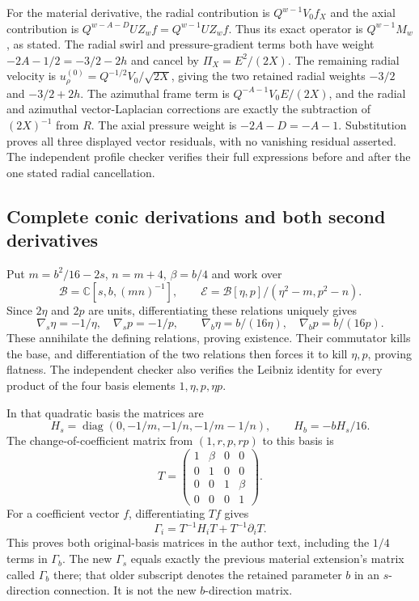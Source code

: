For the material derivative, the radial contribution is
$Q^{w-1}V_0f_X$ and the axial contribution is
$Q^{w-A-D}UZ_wf=Q^{w-1}UZ_wf$.
Thus its exact operator is $Q^{w-1}M_w$, as stated.
The radial swirl and pressure-gradient terms both have weight
$-2A-1/2=-3/2-2h$ and cancel by
$\Pi_X=E^2/(2X)$. The remaining radial velocity is
$u_\rho^{(0)}=Q^{-1/2}V_0/\sqrt{2X}$, giving the two retained
radial weights $-3/2$ and $-3/2+2h$. The azimuthal frame term
is $Q^{-A-1}V_0E/(2X)$, and the radial and azimuthal
vector-Laplacian corrections are exactly the subtraction of
$(2X)^{-1}$ from $R$. The axial pressure weight is
$-2A-D=-A-1$. Substitution proves all three displayed vector
residuals, with no vanishing residual asserted. The independent
profile checker verifies their full expressions before and after
the one stated radial cancellation.

\subsection*{Complete conic derivations and both second derivatives}

Put $m=b^2/16-2s$, $n=m+4$, $\beta=b/4$ and work over
\[
 \mathcal B=\mathbb C[s,b,(mn)^{-1}],\qquad
 \mathcal E=\mathcal B[\eta,p]/(\eta^2-m,p^2-n).
\]
Since $2\eta$ and $2p$ are units, differentiating these relations
uniquely gives
\[
 \nabla_s\eta=-1/\eta,\quad\nabla_sp=-1/p,\qquad
 \nabla_b\eta=b/(16\eta),\quad\nabla_bp=b/(16p).
\]
These annihilate the defining relations, proving existence. Their
commutator kills the base, and differentiation of the two relations
then forces it to kill $\eta,p$, proving flatness. The independent
checker also verifies the Leibniz identity for every product of the
four basis elements $1,\eta,p,\eta p$.

In that quadratic basis the matrices are
\[
 H_s=\operatorname{diag}(0,-1/m,-1/n,-1/m-1/n),\qquad
 H_b=-bH_s/16.
\]
The change-of-coefficient matrix from $(1,r,p,rp)$ to this basis is
\[
 T=\begin{pmatrix}1&\beta&0&0\\0&1&0&0\\
       0&0&1&\beta\\0&0&0&1\end{pmatrix}.
\]
For a coefficient vector $f$, differentiating $Tf$ gives
\[
 \Gamma_i=T^{-1}H_iT+T^{-1}\partial_iT.
\]
This proves both original-basis matrices in the author text, including
the $1/4$ terms in $\Gamma_b$. The new $\Gamma_s$ equals exactly
the previous material extension's matrix called $\Gamma_b$ there;
that older subscript denotes the retained parameter $b$ in an
$s$-direction connection. It is not the new $b$-direction matrix.

